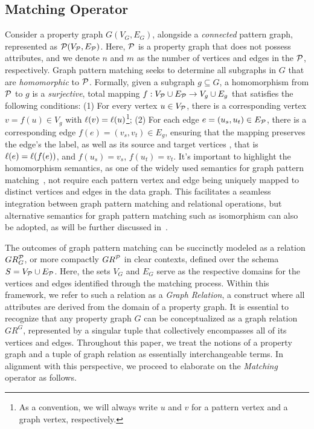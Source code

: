 
\subsection{Matching Operator}
\label{sec:matching-operator}
Consider a property graph \(G(V_G, E_G)\), alongside a \emph{connected} pattern graph, represented as \(\mathcal{P}(V_{\mathcal{P}}, E_{\mathcal{P}})\). Here, \(\mathcal{P}\) is a property graph that does not possess attributes, and
we denote $n$ and $m$ as the number of vertices and edges in the $\mathcal{P}$, respectively.
Graph pattern matching seeks to determine all subgraphs in \(G\) that are \emph{homomorphic} to \(\mathcal{P}\).
Formally, given a subgraph $g \subseteq G$, a homomorphism from \(\mathcal{P}\) to \(g\) is a \emph{surjective}, total mapping \(f: V_{\mathcal{P}} \cup E_{\mathcal{P}} \to V_{g} \cup E_{g}\) that satisfies the following conditions: (1) For every vertex \(u \in V_{\mathcal{P}}\), there is a corresponding vertex \(v = f(u) \in V_{g}\) with \(\mathcal{\ell}(v) = \mathcal{\ell}(u)\)\footnote{As a convention, we will always write $u$ and $v$ for a pattern vertex and a graph vertex, respectively.}; (2) For each edge \(e = (u_s, u_t) \in E_{\mathcal{P}}\), there is a corresponding edge \(f(e) = (v_s, v_t) \in E_{g}\), ensuring that the mapping preserves the edge's the label, as well as its source and target vertices , that is \(\mathcal{\ell}(e) = \mathcal{\ell}(f(e))\), and \(f(u_s) = v_s\), \(f(u_t) = v_t\). It's important to highlight the homomorphism semantics, as one of the widely used semantics for graph pattern matching~\cite{angles2017foundations},  not require each pattern vertex and edge being uniquely mapped to distinct vertices and edges in the data graph. This facilitates a seamless integration between graph pattern matching and relational operations, but alternative semantics for graph pattern matching such as isomorphism can also be adopted, as will be further discussed in~.

The outcomes of graph pattern matching can be succinctly modeled as a relation \(GR_G^{\mathcal{P}}\), or more compactly \(GR^{\mathcal{P}}\) in clear contexts, defined over the schema \(S = V_{\mathcal{P}} \cup E_{\mathcal{P}}\). Here, the sets \(V_G\) and \(E_G\) serve as the respective domains for the vertices and edges identified through the matching process. Within this framework, we refer to such a relation as a \emph{Graph Relation}, a construct where all attributes are derived from the domain of a property graph.
It is essential to recognize that any property graph \(G\) can be conceptualized as a graph relation \(GR^G\), represented by a singular tuple that collectively encompasses all of its vertices and edges. Throughout this paper, we treat the notions of a property graph and a tuple of graph relation as essentially interchangeable terms. In alignment with this perspective, we proceed to elaborate on the \emph{Matching} operator as follows.

